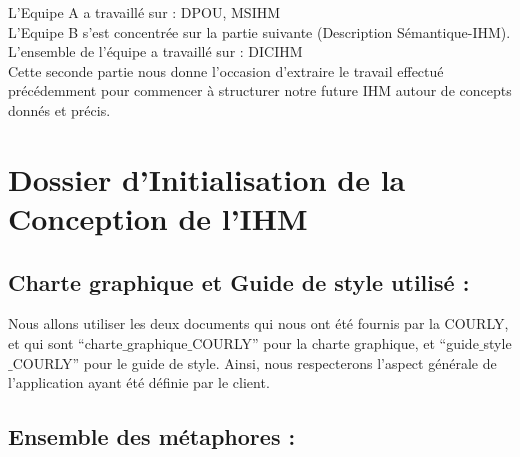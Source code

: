\documentclass{report}
\begin{document}
L'Equipe A a travaillé sur : DPOU, MSIHM\\

L'Equipe B s'est concentrée sur la partie suivante (Description Sémantique-IHM).\\

L’ensemble de l’équipe a travaillé sur : DICIHM\\

Cette seconde partie nous donne l'occasion d'extraire le travail effectué précédemment pour commencer à structurer notre future IHM autour de concepts donnés et précis. 

\section{Dossier d'Initialisation de la Conception de l'IHM}

\subsection{Charte graphique et Guide de style utilisé : }

Nous allons utiliser les deux documents qui nous ont été fournis par la COURLY, et qui sont “charte$\_$graphique$\_$COURLY” pour la charte graphique, et “guide$\_$style$\_$COURLY” pour le guide de style. Ainsi, nous respecterons l’aspect générale de l’application ayant été définie par le client.

\subsection{Ensemble des métaphores : }
\end{document}
